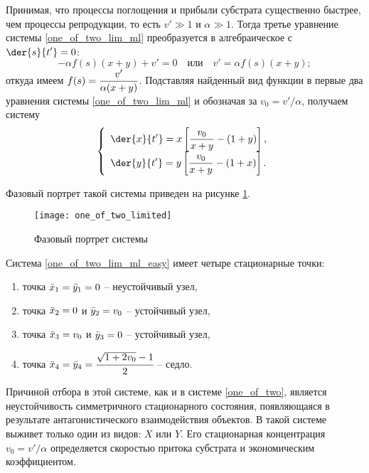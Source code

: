Принимая, что процессы поглощения и прибыли субстрата существенно быстрее, чем
процессы репродукции, то есть \( v' \gg 1 \) и \( \alpha \gg 1 \). Тогда третье
уравнение системы \eqref{one_of_two_lim_ml} преобразуется в алгебраическое
с \( \ds \der{s}{t'} = 0 \):
\[
    -\alpha f(s)(x + y) + v' = 0 \quad \text{или} \quad v' = \alpha f(s)(x + y);
\]
откуда имеем \( \displaystyle f(s) = \frac{v'}{\alpha(x + y)} \). Подставляя найденный
вид функции в первые два уравнения системы \eqref{one_of_two_lim_ml} и
обозначая за \( v_0 = v'/\alpha \), получаем систему
\begin{equation}
    \left\{ \begin{array}{l}
        \ds \der{x}{t'} = x\left[\frac{v_0}{x + y} - (1 + y)\right], \\[.5em]
        \ds \der{y}{t'} = y\left[\frac{v_0}{x + y} - (1 + x)\right].
    \end{array} \right.
    \label{one_of_two_lim_ml_easy}
\end{equation}

Фазовый портрет такой системы приведен на рисунке \ref{phase_one_of_two_lim}.

\begin{figure}[h!]
    \centering
    \texttt{[image: one\_of\_two\_limited]}
    \caption{Фазовый портрет системы}
    \label{phase_one_of_two_lim}
\end{figure}

Система \eqref{one_of_two_lim_ml_easy} имеет четыре стационарные точки:
\begin{enumerate}
    \item точка \( \bar{x}_1 = \bar{y}_1 = 0 \) -- неустойчивый узел,
    \item точка \( \bar{x}_2 = 0 \) и \( \bar{y}_2 = v_0 \) -- устойчивый узел,
    \item точка \( \bar{x}_3 = v_0 \) и \( \bar{y}_3 = 0 \) -- устойчивый узел,
    \item точка \( \bar{x}_4 = \bar{y}_4 = \cfrac{\sqrt{1 + 2v_0} - 1}{2} \) -- седло.
\end{enumerate}

Причиной отбора в этой системе, как и в системе \eqref{one_of_two}, является
неустойчивость симметричного стационарного состояния, появляющаяся в результате
антагонистического взаимодействия объектов. В такой системе выживет только один
из видов: \( X \) или \( Y \). Его стационарная концентрация
\( v_0 = v'/\alpha \) определяется скоростью притока субстрата и экономическим
коэффициентом.

